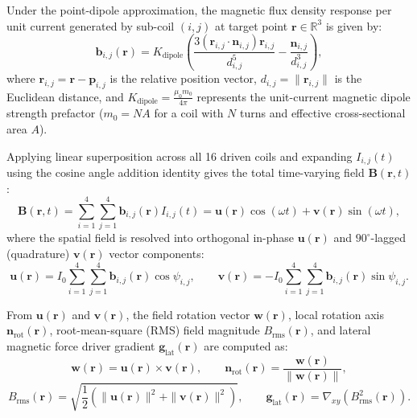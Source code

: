 \documentclass[11pt, a4paper]{article}
\begin{document}
Under the point-dipole approximation, the magnetic flux density response per unit current generated by sub-coil $(i,j)$ at target point $\mathbf{r} \in \mathbb{R}^3$ is given by:
\begin{equation}
    \mathbf{b}_{i,j}(\mathbf{r}) = K_{\text{dipole}} \left( \frac{3 (\mathbf{r}_{i,j} \cdot \mathbf{n}_{i,j}) \mathbf{r}_{i,j}}{d_{i,j}^5} - \frac{\mathbf{n}_{i,j}}{d_{i,j}^3} \right),
\end{equation}
where $\mathbf{r}_{i,j} = \mathbf{r} - \mathbf{p}_{i,j}$ is the relative position vector, $d_{i,j} = \|\mathbf{r}_{i,j}\|$ is the Euclidean distance, and $K_{\text{dipole}} = \frac{\mu_0 m_0}{4\pi}$ represents the unit-current magnetic dipole strength prefactor ($m_0 = N A$ for a coil with $N$ turns and effective cross-sectional area $A$).

Applying linear superposition across all 16 driven coils and expanding $I_{i,j}(t)$ using the cosine angle addition identity gives the total time-varying field $\mathbf{B}(\mathbf{r}, t)$:
\begin{equation}
    \mathbf{B}(\mathbf{r}, t) = \sum_{i=1}^4 \sum_{j=1}^4 \mathbf{b}_{i,j}(\mathbf{r}) I_{i,j}(t) = \mathbf{u}(\mathbf{r}) \cos(\omega t) + \mathbf{v}(\mathbf{r}) \sin(\omega t),
\end{equation}
where the spatial field is resolved into orthogonal in-phase $\mathbf{u}(\mathbf{r})$ and $90^\circ$-lagged (quadrature) $\mathbf{v}(\mathbf{r})$ vector components:
\begin{equation}
    \mathbf{u}(\mathbf{r}) = I_0 \sum_{i=1}^4 \sum_{j=1}^4 \mathbf{b}_{i,j}(\mathbf{r}) \cos\psi_{i,j}, \qquad 
    \mathbf{v}(\mathbf{r}) = -I_0 \sum_{i=1}^4 \sum_{j=1}^4 \mathbf{b}_{i,j}(\mathbf{r}) \sin\psi_{i,j}.
\end{equation}

From $\mathbf{u}(\mathbf{r})$ and $\mathbf{v}(\mathbf{r})$, the field rotation vector $\mathbf{w}(\mathbf{r})$, local rotation axis $\mathbf{n}_{\text{rot}}(\mathbf{r})$, root-mean-square (RMS) field magnitude $B_{\text{rms}}(\mathbf{r})$, and lateral magnetic force driver gradient $\mathbf{g}_{\text{lat}}(\mathbf{r})$ are computed as:
\begin{equation}
    \mathbf{w}(\mathbf{r}) = \mathbf{u}(\mathbf{r}) \times \mathbf{v}(\mathbf{r}), \qquad \mathbf{n}_{\text{rot}}(\mathbf{r}) = \frac{\mathbf{w}(\mathbf{r})}{\|\mathbf{w}(\mathbf{r})\|},
\end{equation}
\begin{equation}
    B_{\text{rms}}(\mathbf{r}) = \sqrt{\frac{1}{2} \left( \|\mathbf{u}(\mathbf{r})\|^2 + \|\mathbf{v}(\mathbf{r})\|^2 \right)}, \qquad \mathbf{g}_{\text{lat}}(\mathbf{r}) = \nabla_{xy} \left( B_{\text{rms}}^2(\mathbf{r}) \right).
\end{equation}
\end{document}
